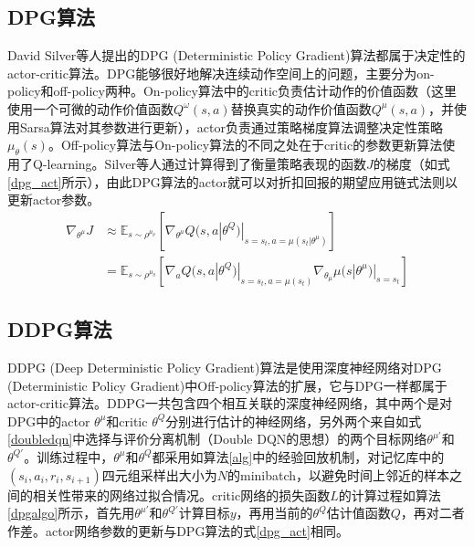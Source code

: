 \subsection{DPG算法}
David Silver等人提出的DPG (Deterministic Policy Gradient)\cite{silver2014deter}算法都属于决定性的actor-critic算法。DPG能够很好地解决连续动作空间上的问题，主要分为on-policy和off-policy两种。On-policy算法中的critic负责估计动作的价值函数（这里使用一个可微的动作价值函数$Q^\omega(s,a)$替换真实的动作价值函数$Q^\mu(s,a)$，并使用Sarsa算法对其参数进行更新），actor负责通过策略梯度算法调整决定性策略$\mu_\theta(s)$。Off-policy算法与On-policy算法的不同之处在于critic的参数更新算法使用了Q-learning。Silver等人通过计算得到了衡量策略表现的函数$J$的梯度\cite{silver2014deter}（如式\ref{dpg_act}所示），由此DPG算法的actor就可以对折扣回报的期望应用链式法则以更新actor参数。
\begin{equation}
\begin{split}
  \nabla_{\theta^\mu} J &\approx
  \mathbb{E}_{s \sim \rho^{\mu_\theta}}\left[\nabla_{\theta^{\mu}}
    Q(s, a | \theta^Q)|_{s = s_t, a = \mu(s_t | \theta^{\mu})}
                   \right] \\
                 & =
    \mathbb{E}_{s \sim \rho^{\mu_\theta}}\left[\nabla_{a} Q(s, a | \theta^{Q})|_{s = s_t, a = \mu(s_t)}
    \nabla_{\theta_\mu} \mu(s | \theta^{\mu})|_{s = s_t} \right]
\end{split}
\label{dpg_act}
\end{equation}

\subsection{DDPG算法}
DDPG (Deep Deterministic Policy Gradient)\cite{timothy2016cont}算法是使用深度神经网络对DPG (Deterministic Policy Gradient)\cite{silver2014deter}中Off-policy算法的扩展，它与DPG一样都属于actor-critic算法。DDPG一共包含四个相互关联的深度神经网络，其中两个是对DPG中的actor $\theta^\mu$和critic $\theta^Q$分别进行估计的神经网络，另外两个来自如式\ref{doubledqn}中选择与评价分离机制（Double DQN的思想）的两个目标网络$\theta^{\mu'}$和$\theta^{Q'}$。训练过程中，$\theta^\mu$和$\theta^Q$都采用如算法\ref{alg}中的经验回放机制，对记忆库中的$(s_i,a_i,r_i,s_{i+1})$四元组采样出大小为$N$的minibatch，以避免时间上邻近的样本之间的相关性带来的网络过拟合情况。critic网络的损失函数$L$的计算过程如算法\ref{dpgalgo}所示，首先用$\theta^{\mu'}$和$\theta^{Q'}$计算目标$y$，再用当前的$\theta^{Q}$估计值函数$Q$，再对二者作差。actor网络参数的更新与DPG算法的式\ref{dpg_act}相同。

